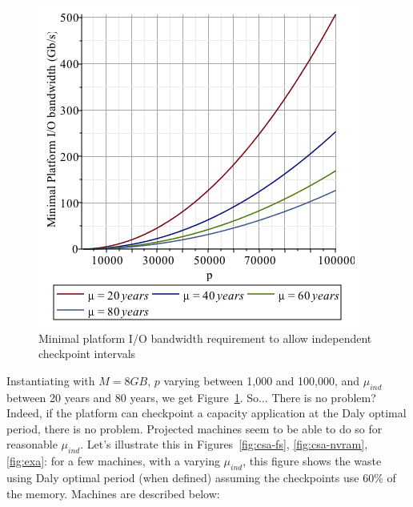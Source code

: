 \documentclass{article}
\begin{document}
\begin{figure}[h!]
  \begin{center}
    \includegraphics[width=.6\linewidth]{biomin.png}
  \end{center}
  \caption{Minimal platform I/O bandwidth requirement to allow independent checkpoint intervals\label{fig:minio}}
\end{figure}
 
Instantiating with $M = 8GB$, $p$ varying between 1,000 and 100,000, and $\mu_{ind}$ between 20 years and 80 years, we get Figure~\ref{fig:minio}. So... There is no problem? Indeed, if the platform can checkpoint a capacity application at the Daly optimal period, there is no problem. Projected machines seem to be able to do so for reasonable $\mu_{ind}$. Let's illustrate this in Figures~\ref{fig:csa-fs}, \ref{fig:csa-nvram}, \ref{fig:exa}: for a few machines, with a varying $\mu_{ind}$, this figure shows the waste using Daly optimal period (when defined) assuming the checkpoints use 60\% of the memory. Machines are described below:
\end{document}
